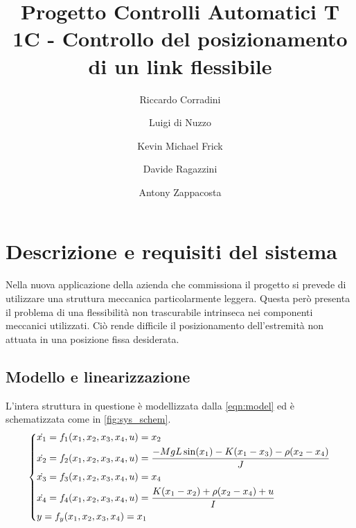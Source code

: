 \documentclass[a4paper]{article}
\title{Progetto Controlli Automatici T \\ 1C - Controllo del posizionamento di un link flessibile}
\author{Riccardo Corradini \and Luigi di Nuzzo \and Kevin Michael Frick \and Davide Ragazzini \and Antony Zappacosta}
\newenvironment{eqsys}{\begin{equation}\begin{dcases}}{\end{dcases}\end{equation}}
\begin{document}
\maketitle
\tableofcontents
\clearpage
\section{Descrizione e requisiti del sistema}
Nella nuova applicazione della azienda che commissiona il progetto si prevede di utilizzare una struttura meccanica particolarmente leggera.
Questa però presenta il problema di una flessibilità non trascurabile intrinseca nei componenti meccanici utilizzati.
Ciò rende difficile il posizionamento dell’estremità non attuata in una posizione fissa desiderata.
\subsection{Modello e linearizzazione}
L’intera struttura in questione è modellizzata dalla \cref{eqn:model} ed è schematizzata come in \cref{fig:sys_schem}.
\begin{eqsys}
    \label{eqn:model}
    \dot{x_1}  =  f_1 (x_1, x_2, x_3, x_4, u)  =  x_2 \\
    \dot{x_2}  =  f_2 (x_1, x_2, x_3, x_4, u)  =  \frac{-M g L \sin (x_1) - K (x_1 - x_3) - \rho (x_2 - x_4)}{J} \\
    \dot{x_3}  =  f_3 (x_1, x_2, x_3, x_4, u)  =  x_4 \\
    \dot{x_4}  =  f_4 (x_1, x_2, x_3, x_4, u)  =  \frac{K(x_1 - x_2) + \rho (x_2 - x_4) + u}{I}\\
    y  =  f_y (x_1, x_2, x_3, x_4)  =  x_1
\end{eqsys}
\end{document}
